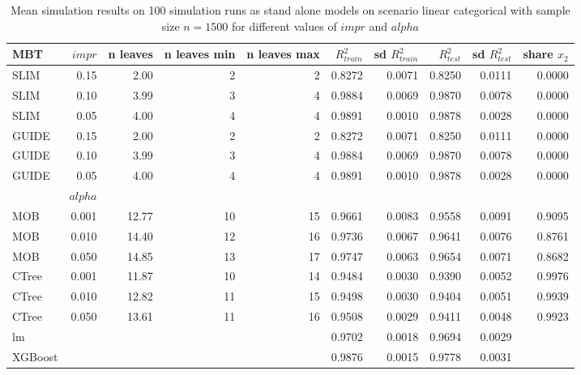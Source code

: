 \begin{table}[!htb]

\centering \tiny
\begin{tabular}[t]{l|r|r|r|r|r|r|r|r|r}
\hline
MBT & $impr$  & n leaves & n leaves min & n leaves max & $R^2_{train}$ & sd $R^2_{train}$ & $R^2_{test}$ & sd $R^2_{test}$ & share $x_2$\\
\hline

\hline
SLIM & 0.15 & 2.00 & 2 & 2 & 0.8272 & 0.0071 & 0.8250 & 0.0111 & 0.0000\\
SLIM & 0.10 & 3.99 & 3 & 4 & 0.9884 & 0.0069 & 0.9870 & 0.0078 & 0.0000\\
SLIM & 0.05 & 4.00 & 4 & 4 & 0.9891 & 0.0010 & 0.9878 & 0.0028 & 0.0000\\
GUIDE & 0.15 & 2.00 & 2 & 2 & 0.8272 & 0.0071 & 0.8250 & 0.0111 & 0.0000\\
GUIDE & 0.10 & 3.99 & 3 & 4 & 0.9884 & 0.0069 & 0.9870 & 0.0078 & 0.0000\\
GUIDE & 0.05 & 4.00 & 4 & 4 & 0.9891 & 0.0010 & 0.9878 & 0.0028 & 0.0000\\
\hline

  & $alpha$ & & & & & & & & \\
\hline
MOB & 0.001 & 12.77 & 10 & 15 & 0.9661 & 0.0083 & 0.9558 & 0.0091 & 0.9095\\
MOB & 0.010 & 14.40 & 12 & 16 & 0.9736 & 0.0067 & 0.9641 & 0.0076 & 0.8761\\
MOB & 0.050 & 14.85 & 13 & 17 & 0.9747 & 0.0063 & 0.9654 & 0.0071 & 0.8682\\
CTree & 0.001 & 11.87 & 10 & 14 & 0.9484 & 0.0030 & 0.9390 & 0.0052 & 0.9976\\
CTree & 0.010 & 12.82 & 11 & 15 & 0.9498 & 0.0030 & 0.9404 & 0.0051 & 0.9939\\
CTree & 0.050 & 13.61 & 11 & 16 & 0.9508 & 0.0029 & 0.9411 & 0.0048 & 0.9923\\
\hline
lm & & & & & 0.9702 & 0.0018 & 0.9694 & 0.0029 &\\
XGBoost & & & & & 0.9876 & 0.0015 & 0.9778 & 0.0031 & \\
\hline

\end{tabular}
\caption{Mean simulation results on 100 simulation runs as stand alone models on scenario linear categorical with sample size $n = 1500$ for different values of $impr$ and $alpha$}
\label{tab:linear_abrupt_summary} 
\end{table}



